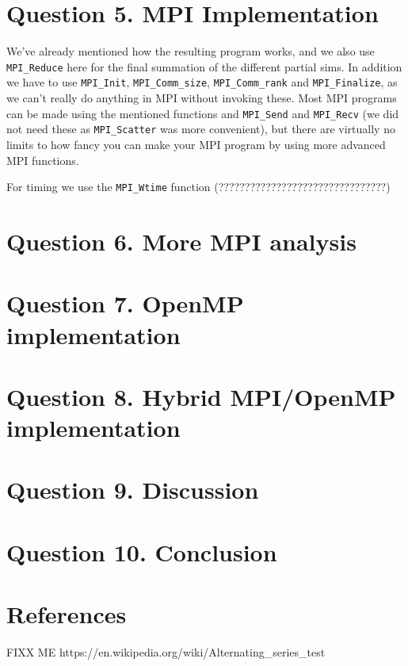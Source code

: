 \documentclass[12pt]{article}
\begin{document}
\section{Question 5. MPI Implementation}
We've already mentioned how the resulting program works, and we also use \texttt{MPI\_Reduce} here for the final summation of the different
partial sims. In addition we have to use \texttt{MPI\_Init}, 
\texttt{MPI\_Comm\_size}, \texttt{MPI\_Comm\_rank} and \texttt{MPI\_Finalize}, as we can't really do anything in MPI without invoking these. 
Most MPI programs can be made using the mentioned functions and \texttt{MPI\_Send} and \texttt{MPI\_Recv} (we did not need these as \texttt{MPI\_Scatter} was more convenient),
but there are virtually no limits to how fancy you can make your MPI program
by using more advanced MPI functions.

For timing we use the \texttt{MPI\_Wtime} function (????????????????????????????????)

\section{Question 6. More MPI analysis}

\section{Question 7. OpenMP implementation}

\section{Question 8. Hybrid MPI/OpenMP implementation}

\section{Question 9. Discussion}

\section{Question 10. Conclusion}

\section{References}
FIXX ME
https://en.wikipedia.org/wiki/Alternating\_series\_test
\end{document}
